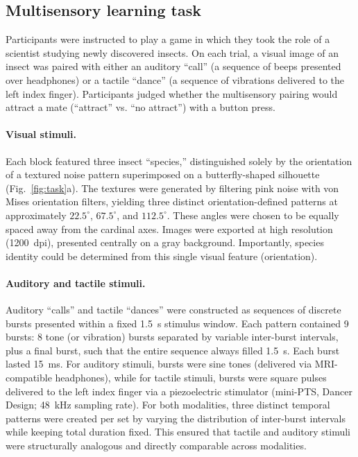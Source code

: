 \documentclass{article}
\begin{document}
\subsection*{Multisensory learning task}

Participants were instructed to play a game in which they took the role of a scientist studying newly discovered insects. On each trial, a visual image of an insect was paired with either an auditory “call” (a sequence of beeps presented over headphones) or a tactile “dance” (a sequence of vibrations delivered to the left index finger). Participants judged whether the multisensory pairing would attract a mate (“attract” vs. “no attract”) with a button press.

\paragraph{Visual stimuli.}
Each block featured three insect “species,” distinguished solely by the orientation of a textured noise pattern superimposed on a butterfly-shaped silhouette (Fig.~\ref{fig:task}a). The textures were generated by filtering pink noise with von Mises orientation filters, yielding three distinct orientation-defined patterns at approximately $22.5^\circ$, $67.5^\circ$, and $112.5^\circ$. These angles were chosen to be equally spaced away from the cardinal axes. Images were exported at high resolution (1200~dpi), presented centrally on a gray background. Importantly, species identity could be determined from this single visual feature (orientation).

\paragraph{Auditory and tactile stimuli.}
Auditory “calls” and tactile “dances” were constructed as sequences of discrete bursts presented within a fixed 1.5~s stimulus window. Each pattern contained 9 bursts: 8 tone (or vibration) bursts separated by variable inter-burst intervals, plus a final burst, such that the entire sequence always filled 1.5~s. Each burst lasted 15~ms. For auditory stimuli, bursts were sine tones (delivered via MRI-compatible headphones), while for tactile stimuli, bursts were square pulses delivered to the left index finger via a piezoelectric stimulator (mini-PTS, Dancer Design; 48~kHz sampling rate). For both modalities, three distinct temporal patterns were created per set by varying the distribution of inter-burst intervals while keeping total duration fixed. This ensured that tactile and auditory stimuli were structurally analogous and directly comparable across modalities.
\end{document}

